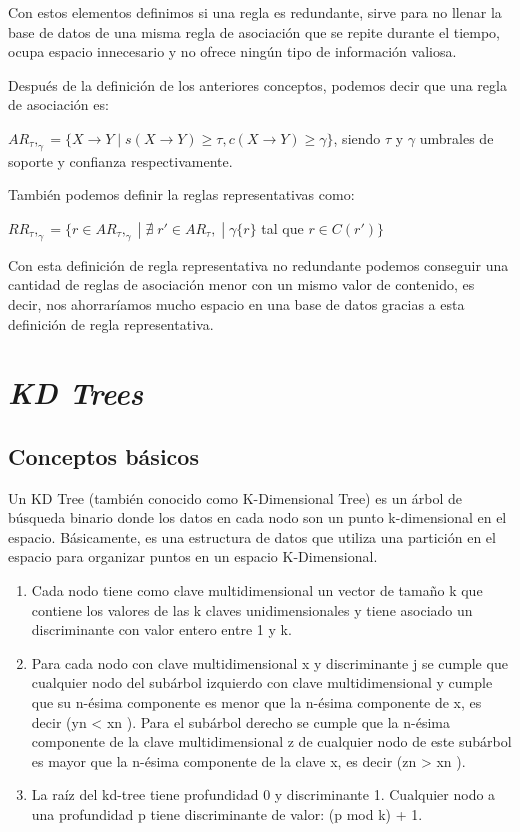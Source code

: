 \documentclass{cosas/tfg_domingo}
\begin{document}
Con estos elementos definimos si una regla es redundante, sirve para no llenar la base de datos de una misma regla de asociación que se repite durante el tiempo, ocupa espacio innecesario y no ofrece ningún tipo de información valiosa.

Después de la definición de los anteriores conceptos, podemos decir  que una regla de asociación es:

$AR_\tau,_\gamma=\{X\rightarrow Y \;|\; s(X \rightarrow Y)\geq \tau,c(X \rightarrow Y) \geq \gamma\}$, siendo $\tau$ y $\gamma$ umbrales de soporte y confianza respectivamente.

También podemos definir la reglas representativas como:

$RR_\tau,_\gamma=\{r \in AR_\tau,_\gamma \;|\; \nexists \; r′ \in AR_\tau, \;|\; \gamma\{r\}$ tal que $r \in C(r′)\}$ \citep{UC}

Con esta definición de regla representativa no redundante podemos conseguir una cantidad de reglas de asociación menor con un mismo valor de contenido, es decir, nos ahorraríamos mucho espacio en una base de datos gracias a esta definición de regla representativa.








\chapter{\emph{KD Trees}}

\section{Conceptos básicos}

Un KD Tree (también conocido como K-Dimensional Tree) es un árbol de búsqueda binario donde los datos en cada nodo son un punto k-dimensional en el espacio. Básicamente, es una estructura de datos que utiliza una partición en el espacio para organizar puntos en un espacio K-Dimensional.

\begin{enumerate}
    \item Cada nodo tiene como clave multidimensional un vector de tamaño k
que contiene los valores de las k claves unidimensionales y tiene asociado un discriminante con valor entero entre 1 y k.
    \item Para cada nodo con clave multidimensional x y discriminante j se
cumple que cualquier nodo del subárbol izquierdo con clave multidimensional y cumple que su n-ésima componente es menor que la n-ésima componente de x, es decir (yn < xn ). Para el subárbol derecho se cumple que la n-ésima componente de la clave multidimensional z de cualquier nodo de este subárbol es mayor que la n-ésima componente de la clave x, es decir (zn > xn ).
    \item La raíz del kd-tree tiene profundidad 0 y discriminante 1. Cualquier
nodo a una profundidad p tiene discriminante de valor: (p mod k) + 1.
\citep{marti2010copy}
\end{enumerate}
\end{document}

